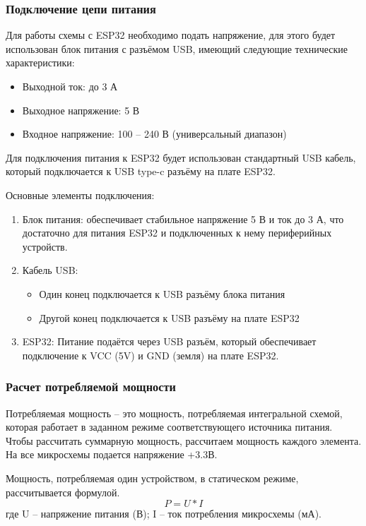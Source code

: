 \documentclass{bmstu}
\begin{document}
    \subsubsection{Подключение цепи питания}

    Для работы схемы с ESP32 необходимо подать напряжение, для этого будет использован блок питания с разъёмом USB,
    имеющий следующие технические характеристики:
    \begin{itemize}
        \item Выходной ток: до 3 А
        \item Выходное напряжение: 5 В
        \item Входное напряжение: 100 – 240 В (универсальный диапазон)
    \end{itemize}

    Для подключения питания к ESP32 будет использован стандартный USB кабель,
    который подключается к USB type-c разъёму на плате ESP32.

    Основные элементы подключения:
    \begin{enumerate}
        \item Блок питания: обеспечивает стабильное напряжение 5 В и ток до 3 А, что достаточно для питания ESP32 и
        подключенных к нему периферийных устройств.
        \item Кабель USB:
        \begin{itemize}
            \item Один конец подключается к USB разъёму блока питания
            \item Другой конец подключается к USB разъёму на плате ESP32
        \end{itemize}
        \item ESP32: Питание подаётся через USB разъём, который обеспечивает подключение к VCC (5V) и GND (земля) на плате ESP32.
    \end{enumerate}

    \subsubsection{Расчет потребляемой мощности}

    Потребляемая мощность – это мощность, потребляемая интегральной схемой, которая работает в заданном режиме соответствующего источника питания.
	Чтобы рассчитать суммарную мощность, рассчитаем мощность каждого элемента.
    На все микросхемы подается напряжение +3.3В.

    Мощность, потребляемая один устройством, в статическом режиме, рассчитывается формулой.
    \[P = U * I\]
	где U – напряжение питания (В); I – ток потребления микросхемы (мА).
\end{document}

